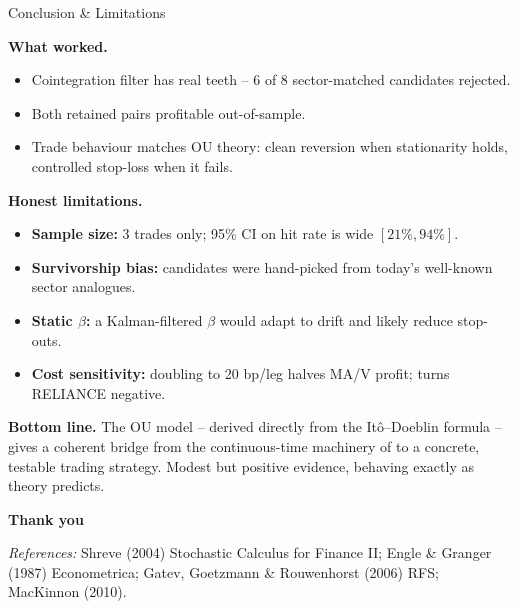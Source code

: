 \documentclass[10pt,aspectratio=169]{beamer}
\begin{document}
\begin{frame}{Conclusion \& Limitations}

\textbf{What worked.}
\begin{itemize}
  \item Cointegration filter has real teeth -- 6 of 8 sector-matched
        candidates rejected.
  \item Both retained pairs profitable out-of-sample.
  \item Trade behaviour matches OU theory: clean reversion when
        stationarity holds, controlled stop-loss when it fails.
\end{itemize}

\bigskip
\textbf{Honest limitations.}
\begin{itemize}
  \item \textbf{Sample size:} 3 trades only; 95\% CI on hit rate is wide $[21\%, 94\%]$.
  \item \textbf{Survivorship bias:} candidates were hand-picked from
        today's well-known sector analogues.
  \item \textbf{Static $\beta$:} a Kalman-filtered $\beta$ would adapt
        to drift and likely reduce stop-outs.
  \item \textbf{Cost sensitivity:} doubling to 20 bp/leg halves MA/V
        profit; turns RELIANCE negative.
\end{itemize}

\bigskip
\textbf{Bottom line.} The OU model -- derived directly from the
It\^o--Doeblin formula -- gives a coherent bridge from the continuous-time
machinery of to a concrete, testable trading strategy.
Modest but positive evidence, behaving exactly as theory predicts.

\end{frame}

\begin{frame}
  \centering
  \vspace{1.5cm}
  {\Huge\textbf{Thank you}}\\[0.8cm]

  \vspace{2cm}

  \footnotesize
  \emph{References:}
  Shreve (2004) Stochastic Calculus for Finance II;
  Engle \& Granger (1987) Econometrica;
  Gatev, Goetzmann \& Rouwenhorst (2006) RFS;
  MacKinnon (2010).
\end{frame}
\end{document}
